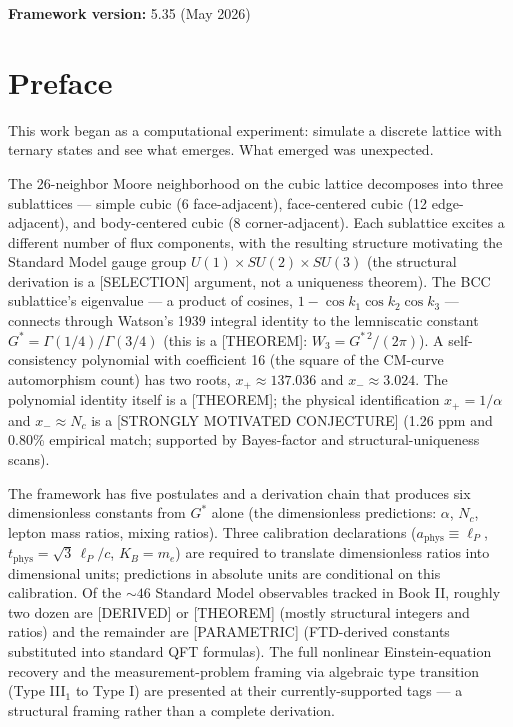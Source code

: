 \documentclass[
  11pt,
  letterpaper,
  twoside,
  openright]{book}
\begin{document}
\textbf{Framework version:} 5.35 (May 2026)


\chapter*{Preface}\label{preface}


This work began as a computational experiment: simulate a discrete
lattice with ternary states and see what emerges. What emerged was
unexpected.

The 26-neighbor Moore neighborhood on the cubic lattice decomposes into
three sublattices --- simple cubic (6 face-adjacent), face-centered
cubic (12 edge-adjacent), and body-centered cubic (8 corner-adjacent).
Each sublattice excites a different number of flux components, with the
resulting structure motivating the Standard Model gauge group
\(U(1) \times SU(2) \times SU(3)\) (the structural derivation is a
{[}SELECTION{]} argument, not a uniqueness theorem). The BCC
sublattice's eigenvalue --- a product of cosines,
\(1 - \cos k_1 \cos k_2 \cos k_3\) --- connects through Watson's 1939
integral identity to the lemniscatic constant
\(G^* = \Gamma(1/4)/\Gamma(3/4)\) (this is a {[}THEOREM{]}:
\(W_3 = G^{*\,2}/(2\pi)\)). A self-consistency polynomial with
coefficient 16 (the square of the CM-curve automorphism count) has two
roots, \(x_+ \approx 137.036\) and \(x_- \approx 3.024\). The polynomial
identity itself is a {[}THEOREM{]}; the physical identification
\(x_+ = 1/\alpha\) and \(x_- \approx N_c\) is a {[}STRONGLY MOTIVATED
CONJECTURE{]} (1.26 ppm and 0.80\% empirical match; supported by
Bayes-factor and structural-uniqueness scans).

The framework has five postulates and a derivation chain that produces
six dimensionless constants from \(G^*\) alone (the dimensionless
predictions: \(\alpha\), \(N_c\), lepton mass ratios, mixing ratios).
Three calibration declarations (\(a_\mathrm{phys} \equiv \ell_P\),
\(t_\mathrm{phys} = \sqrt{3}\,\ell_P/c\), \(K_B = m_e\)) are required to
translate dimensionless ratios into dimensional units; predictions in
absolute units are conditional on this calibration. Of the \(\sim 46\)
Standard Model observables tracked in Book II, roughly two dozen are
{[}DERIVED{]} or {[}THEOREM{]} (mostly structural integers and ratios)
and the remainder are {[}PARAMETRIC{]} (FTD-derived constants
substituted into standard QFT formulas). The full nonlinear
Einstein-equation recovery and the measurement-problem framing via
algebraic type transition (Type III\(_1\) to Type I) are presented at
their currently-supported tags --- a structural framing rather than a
complete derivation.
\end{document}
